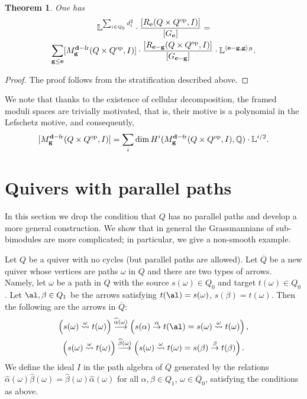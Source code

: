 \documentclass[12pt,a4paper]{amsart}
\numberwithin{equation}{section}
\newtheorem{thm}{Theorem}[section]
\theoremstyle{remark}
\begin{document}
\begin{thm}\label{thm:recursion}
One has
\begin{multline*}
\mathbb{L}^{\sum_{i\in Q_0}d_i^2}\cdot\frac{[R_{\bf e}(Q\times Q^{\rm op},I)]}{[G_{\bf e}]}=\\
\sum_{{\bf g}\leq{\bf e}}[M_{\bf g}^{{\bf d}-{\rm fr}}(Q\times Q^{\rm op},I)]\cdot\frac{[R_{{\bf e}-{\bf g}}(Q\times Q^{\rm op},I)]}{[G_{{\bf e}-{\bf g}}]}\cdot\mathbb{L}^{\langle{\bf e}-{\bf g},{\bf g}\rangle_B}.
\end{multline*}
\end{thm}
\begin{proof}
The proof follows from the stratification described above.
\end{proof}

We note that thanks to the existence of cellular decomposition,
the framed moduli spaces are trivially motivated, that is, their motive is a polynomial in the Lefschetz motive, and consequently,
$$[M_{\bf g}^{{\bf d}-{\rm fr}}(Q\times Q^{\rm op},I)]=\sum_i\dim H^i(M_{\bf g}^{{\bf d}-{\rm fr}}(Q\times Q^{\rm op},I),\mathbb{Q})\cdot\mathbb{L}^{i/2}.$$



\section{Quivers with parallel paths}\label{sec:parallel}
In this section we drop the condition that $Q$ has no parallel paths and develop
a more general construction. We show that in general the Grassmannians of sub-bimodules are more
complicated; in particular, we give
a non-smooth example.

Let $Q$ be a quiver with no cycles (but parallel paths are allowed). Let $\overline Q$ be a 
new quiver whose vertices are paths $\omega$ in $Q$ and there are two types of arrows.
Namely, let $\omega$ be a path in $Q$ with the source $s(\omega)\in Q_0$ and target $t(\omega)\in Q_0$. Let $\al,\beta\in Q_1$ be the arrows satisfying $t(\al)=s(\omega)$,
$s(\beta)=t(\omega)$. Then the following are the arrows in $\overline Q$:
\begin{gather}\label{eq:firsttype}
\left(s(\omega) \stackrel{\omega}{\rightsquigarrow} t(\omega)\right) 
\stackrel{\widehat\alpha(\omega)}{\longrightarrow} 
\left(s(\alpha)\stackrel{\alpha}{\rightarrow} t(\al) = s(\omega)  \stackrel{\omega}{\rightsquigarrow} t(\omega)\right),\\ \label{eq:secondtype}
\left(s(\omega) \stackrel{\omega}{\rightsquigarrow} t(\omega)\right) 
\stackrel{\widehat\beta(\omega)}{\longrightarrow} 
\left(s(\omega)  \stackrel{\omega}{\rightsquigarrow} t(\omega)=s(\beta) \stackrel{\beta}{\rightarrow} t(\beta)\right).
\end{gather}
We define the ideal $I$ in the path algebra of $\overline Q$ generated by the relations
$\widehat\alpha(\omega)\widehat\beta(\omega)=\widehat\beta(\omega)\widehat\alpha(\omega)$ for
all $\alpha,\beta\in Q_1$, $\omega\in\overline Q_0$, satisfying the conditions as above. 
\end{document}
